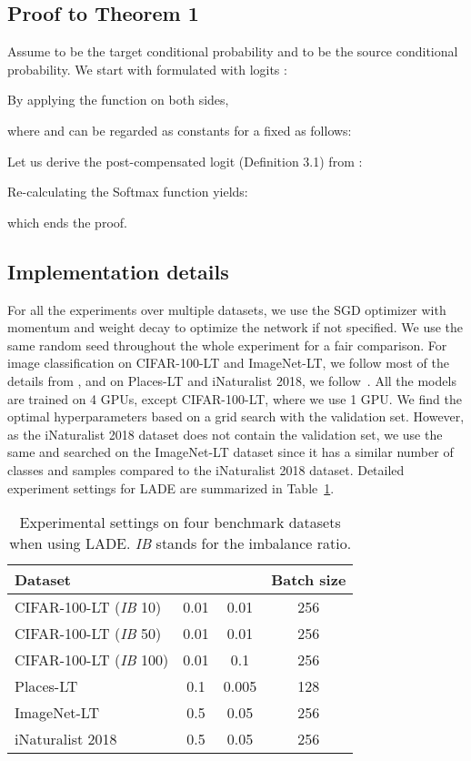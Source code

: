 \documentclass[final]{cvpr}
\begin{document}
\subsection{Proof to Theorem 1}
Assume  to be the target conditional probability and  to be the source conditional probability. We start with  formulated with logits :

By applying the  function on both sides,

where  and  can be regarded as constants for a fixed  as follows:

Let us derive the post-compensated logit  (Definition 3.1) from :

Re-calculating the Softmax function yields:

which ends the proof.

\subsection{Implementation details}
For all the experiments over multiple datasets, we use the SGD optimizer with momentum  and weight decay  to optimize the network if not specified.
We use the same random seed throughout the whole experiment for a fair comparison.
For image classification on CIFAR-100-LT and ImageNet-LT, we follow most of the details from \cite{tang2020long}, and on Places-LT and iNaturalist 2018, we follow~\cite{kang2019decoupling}.
All the models are trained on 4 GPUs, except CIFAR-100-LT, where we use 1 GPU.
We find the optimal hyperparameters based on a grid search with the validation set. 
However, as the iNaturalist 2018 dataset does not contain the validation set, we use the same  and  searched on the ImageNet-LT dataset since it has a similar number of classes and samples compared to the iNaturalist 2018 dataset.
Detailed experiment settings for LADE are summarized in Table~\ref{tab:07_hparams}.
\begin{table}[h]
\footnotesize
\centering
\caption{Experimental settings on four benchmark datasets when using LADE. \textit{IB} stands for the imbalance ratio.}
\vspace{0pt}
{
\begin{tabular}{l c c c}
\toprule
Dataset &  &  & Batch size \\
\midrule
CIFAR-100-LT (\textit{IB} 10) & 0.01 & 0.01 & 256 \\
CIFAR-100-LT (\textit{IB} 50) & 0.01 & 0.01 & 256 \\
CIFAR-100-LT (\textit{IB} 100) & 0.01 & 0.1 & 256 \\
Places-LT & 0.1 & 0.005 & 128\\
ImageNet-LT & 0.5 & 0.05 & 256 \\
iNaturalist 2018 & 0.5 & 0.05 & 256 \\
\bottomrule
\end{tabular}
}
\label{tab:07_hparams}
\vspace{0mm}
\end{table} 
\end{document}
